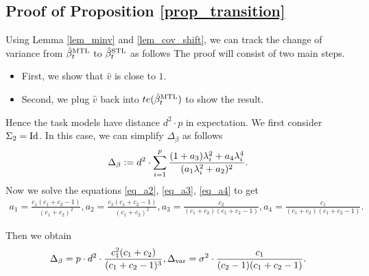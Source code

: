\subsection{Proof of Proposition \ref{prop_transition}}

Using Lemma \ref{lem_minv} and \ref{lem_cov_shift}, we can track the change of variance from $\hat{\beta}_t^{\text{MTL}}$ to $\hat{\beta}_t^{\text{STL}}$ as follows
The proof will consist of two main steps.
\begin{itemize}
	\item First, we show that $\hat{v}$ is close to $1$.
	\item Second, we plug $\hat{v}$ back into $te(\hat{\beta}_t^{\text{MTL}})$ to show the result.
\end{itemize}

Hence the task models have distance $d^2\cdot p$ in expectation.
	We first consider $\Sigma_2 = \operatorname{Id}$. In this case, we can simplify $\Delta_{\beta}$ as follows
	\begin{align} \label{eq_delta_simple}
		\Delta_{\beta} := d^2 \cdot \sum_{i=1}^p \frac{(1 + a_3)\lambda_i^2 + a_4 \lambda_i^4}{(a_1 \lambda_i^2 + a_2)^2}.
	\end{align}
	Now we solve the equations \eqref{eq_a2}, \eqref{eq_a3}, \eqref{eq_a4} to get
	\begin{align}
		a_1 = \frac{c_1(c_1 + c_2 - 1)}{(c_1 + c_2)^2},
		a_2 = \frac{c_2(c_1 + c_2 - 1)}{(c_1 + c_2)^2},
		a_3 = \frac{c_2}{(c_1 + c_2)(c_1 + c_2 - 1)},
		a_4 = \frac{c_1}{(c_1 + c_2)(c_1 + c_2 - 1)}.
	\end{align}

	Then we obtain
	\begin{align}
		\Delta_{\beta} = p \cdot d^2 \cdot \frac{c_1^2 (c_1 + c_2)}{(c_1 + c_2 - 1)^3},
		\Delta_{\text{var}} = \sigma^2 \cdot \frac{c_1}{(c_2 - 1)(c_1 + c_2 - 1)}.
	\end{align}
